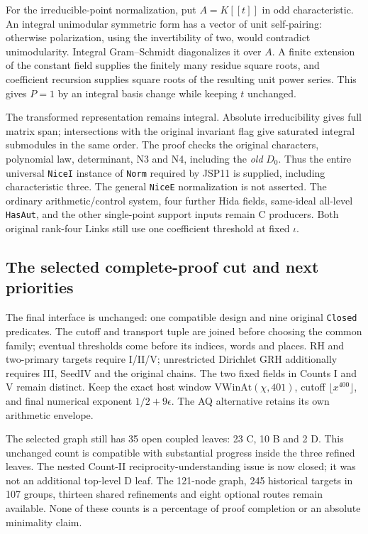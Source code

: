 For the irreducible-point normalization, put
\(A=K[[t]]\) in odd characteristic. An integral unimodular symmetric
form has a vector of unit self-pairing: otherwise polarization,
using the invertibility of two, would contradict unimodularity.
Integral Gram--Schmidt diagonalizes it over \(A\). A finite extension
of the constant field supplies the finitely many residue square
roots, and coefficient recursion supplies square roots of the
resulting unit power series. This gives \(P=1\) by an integral
basis change while keeping \(t\) unchanged.

The transformed representation remains integral. Absolute
irreducibility gives full matrix span; intersections with the
original invariant flag give saturated integral submodules in the
same order. The proof checks the original characters, polynomial
law, determinant, N3 and N4, including the \emph{old} \(D_0\).
Thus the entire universal \texttt{NiceI} instance of \texttt{Norm}
required by JSP11 is supplied, including characteristic three.
The general \texttt{NiceE} normalization is not asserted.
The ordinary arithmetic/control system, four further Hida fields,
same-ideal all-level \texttt{HasAut}, and the other single-point
support inputs remain C producers. Both original rank-four Links
still use one coefficient threshold at fixed \(\iota\).

\subsection{The selected complete-proof cut and next priorities}

The final interface is unchanged: one compatible design and nine
original \texttt{Closed} predicates. The cutoff and transport tuple
are joined before choosing the common family; eventual thresholds
come before its indices, words and places. RH and two-primary
targets require I/II/V; unrestricted Dirichlet GRH additionally
requires III, SeedIV and the original chains. The two fixed fields
in Counts I and V remain distinct. Keep the exact host window
\(\mathrm{VWinAt}(\chi,401)\), cutoff \(\lfloor x^{400}\rfloor\),
and final numerical exponent \(1/2+9\epsilon\). The AQ alternative
retains its own arithmetic envelope.

The selected graph still has 35 open coupled leaves: 23 C, 10 B
and 2 D. This unchanged count is compatible with substantial
progress inside the three refined leaves. The nested Count-II
reciprocity-understanding issue is now closed; it was not an
additional top-level D leaf. The 121-node graph, 245 historical
targets in 107 groups, thirteen shared refinements and eight
optional routes remain available. None of these counts is a
percentage of proof completion or an absolute minimality claim.

